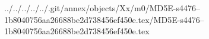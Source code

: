 ../../../../../.git/annex/objects/Xx/m0/MD5E-s4476--1b8040756aa26688be2d738456ef450e.tex/MD5E-s4476--1b8040756aa26688be2d738456ef450e.tex